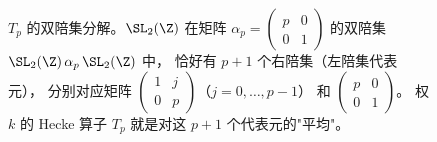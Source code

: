 \begin{figure}[ht]
\caption{$T_p$ 的双陪集分解。$\SL_2(\Z)$ 在矩阵 $\alpha_p = \begin{pmatrix}p&0\\0&1\end{pmatrix}$
的双陪集 $\SL_2(\Z)\,\alpha_p\,\SL_2(\Z)$ 中，
恰好有 $p+1$ 个右陪集（左陪集代表元），
分别对应矩阵 $\begin{pmatrix}1&j\\0&p\end{pmatrix}$（$j=0,\ldots,p-1$）
和 $\begin{pmatrix}p&0\\0&1\end{pmatrix}$。
权 $k$ 的 Hecke 算子 $T_p$ 就是对这 $p+1$ 个代表元的"平均"。}
\label{fig:hecke-double-coset}
\end{figure}
